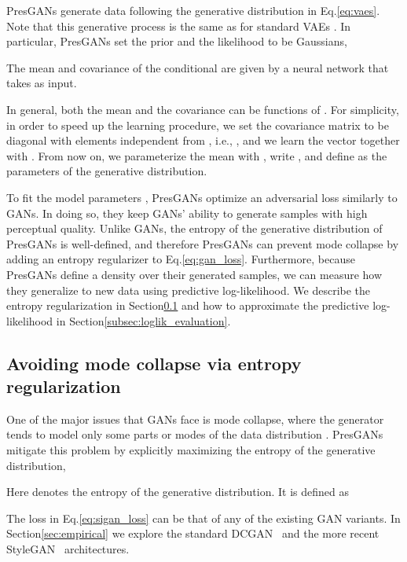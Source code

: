 \documentclass[11pt]{article}
\begin{document}
Pres\glspl{GAN} generate data following the generative distribution in Eq.\nobreakspace \ref {eq:vaes}. 
Note that this generative process is the same as for standard \glspl{VAE} \citep{kingma2013auto,rezende2014stochastic}.
In particular, Pres\glspl{GAN} set the prior  and the likelihood  to be Gaussians, 

The mean  and covariance  of the conditional  are given by a neural network that takes  as input.

In general, both the mean  and the covariance  can be functions of . For simplicity, in order to speed up the learning procedure, we set
the covariance matrix to be diagonal with elements independent from , i.e., , and we learn the vector  together with . From now on, we parameterize the mean with , write , and define  as the parameters of the generative distribution.

To fit the model parameters , Pres\glspl{GAN} optimize an adversarial loss similarly to \glspl{GAN}.
In doing so, they keep \glspl{GAN}' ability to generate samples with high perceptual quality. Unlike \glspl{GAN}, the entropy of the generative distribution of Pres\glspl{GAN} is well-defined, and therefore Pres\glspl{GAN} can prevent mode collapse by adding an entropy regularizer to Eq.\nobreakspace \ref {eq:gan_loss}. Furthermore, because Pres\glspl{GAN} define a density over their generated samples, we can measure how they generalize to new data using predictive log-likelihood. 
We describe the entropy regularization in Section\nobreakspace \ref {subsec:entropy_reg} and how to approximate the predictive log-likelihood in Section\nobreakspace \ref {subsec:loglik_evaluation}.

\subsection{Avoiding mode collapse via entropy regularization}
\label{subsec:entropy_reg}

One of the major issues that \glspl{GAN} face is mode collapse, where the generator tends to model only some parts or modes of the data distribution \citep{arora2017generalization, arora2018gans}. 
Pres\glspl{GAN} mitigate this problem by explicitly maximizing the entropy of the generative distribution,

Here  denotes the entropy of the generative distribution. It is defined as

The loss  in Eq.\nobreakspace \ref {eq:sigan_loss} can be that of any of the existing \gls{GAN} variants. In Section\nobreakspace \ref {sec:empirical} we explore the standard \gls{DCGAN}~\citep{radford2015unsupervised} and the more recent Style\gls{GAN}~\citep{karras2019style} architectures. 
\end{document}
